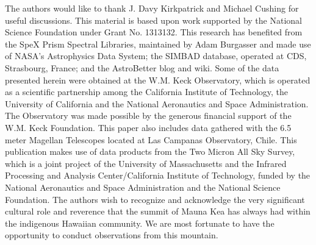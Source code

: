 \documentclass[modern,trackchanges]{aastex61}
\begin{document}
The authors would like to thank J. Davy Kirkpatrick and Michael Cushing for useful discussions.
This material is based upon work supported by the National Science Foundation under Grant No. 1313132.
This research has benefited from the SpeX Prism Spectral Libraries, maintained by Adam Burgasser
and made use of NASA's Astrophysics Data System; the SIMBAD database, operated at CDS, Strasbourg, France; and the AstroBetter blog and wiki.
Some of the data presented herein were obtained at the W.M. Keck Observatory, which is operated as a scientific partnership among the California Institute of Technology, the University of California and the National Aeronautics and Space Administration. The Observatory was made possible by the generous financial support of the W.M. Keck Foundation.
This paper also includes data gathered with the 6.5 meter Magellan Telescopes located at Las Campanas Observatory, Chile.
This publication makes use of data products from the Two Micron All Sky Survey, which is a joint project of the University of Massachusetts and the Infrared Processing and Analysis Center/California Institute of Technology, funded by the National Aeronautics and Space Administration and the National Science Foundation.
The authors wish to recognize and acknowledge the very significant cultural role and reverence that the summit of Mauna Kea has always had within the indigenous Hawaiian community.  We are most fortunate to have the opportunity to conduct observations from this mountain.





\listofchanges
\end{document}
